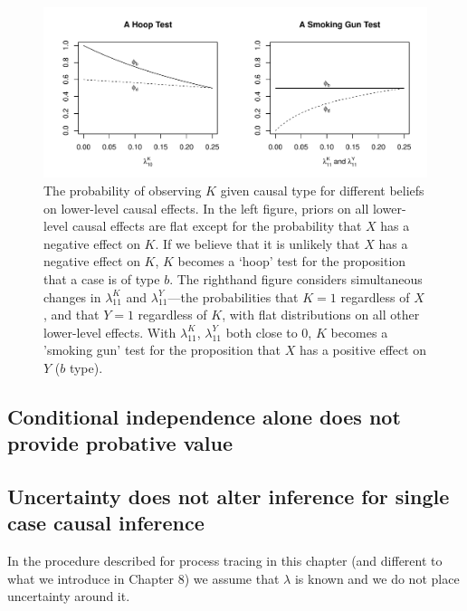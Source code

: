\documentclass[12pt,]{book}
\begin{document}
\begin{figure}

{\centering \includegraphics[width=.85\textwidth]{ii_files/figure-latex/phis-1} 

}

\caption{The probability of observing $K$ given causal type for different beliefs on lower-level causal effects. In the left figure, priors on all lower-level causal effects are flat except for the probability that $X$ has a negative effect on $K$. If we believe that it is unlikely that $X$ has a negative effect on $K$, $K$ becomes a `hoop' test for the proposition that a case is of type $b$. The righthand figure considers simultaneous changes in $\lambda_{11}^K$ and  $\lambda_{11}^Y$---the probabilities that $K=1$ regardless of $X$, and that $Y=1$  regardless of $K$, with flat distributions on all other lower-level effects. With $\lambda_{11}^K$, $\lambda_{11}^Y$ both close to 0, $K$ becomes a 'smoking gun' test for the proposition that $X$ has a positive effect on $Y$ ($b$ type).}\label{fig:phis}
\end{figure}

\hypertarget{conditional-independence-alone-does-not-provide-probative-value}{%
\subsection{Conditional independence alone does not provide probative value}\label{conditional-independence-alone-does-not-provide-probative-value}}

\hypertarget{uncertainty-does-not-alter-inference-for-single-case-causal-inference}{%
\subsection{Uncertainty does not alter inference for single case causal inference}\label{uncertainty-does-not-alter-inference-for-single-case-causal-inference}}

In the procedure described for process tracing in this chapter (and different to what we introduce in Chapter 8) we assume that \(\lambda\) is known and we do not place uncertainty around it.
\end{document}

